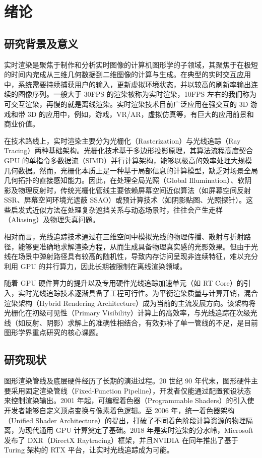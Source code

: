
\chapter{绪论}
\label{chap:introduction}

\section{研究背景及意义}
实时渲染是聚焦于制作和分析实时图像的计算机图形学的子领域，其聚焦于在极短的时间内完成从三维几何数据到二维图像的计算与生成。在典型的实时交互应用中，系统需要持续捕获用户的输入，更新虚拟环境状态，并以较高的刷新率输出连续的图像序列。一般大于 30FPS  的渲染被称为实时渲染，10FPS 左右的我们称为可交互渲染，再慢的就是离线渲染。实时渲染技术目前广泛应用在强交互的 3D 游戏和带 3D 的应用中，例如，游戏，VR/AR，虚拟仿真等，有巨大的应用前景和商业价值。

在技术路线上，实时渲染主要分为光栅化（Rasterization）与光线追踪（Ray Tracing）两种基础架构。光栅化技术基于多边形投影原理，其算法流程高度契合 GPU 的单指令多数据流（SIMD）并行计算架构，能够以极高的效率处理大规模几何数据。然而，光栅化本质上是一种基于局部信息的计算模型，缺乏对场景全局几何拓扑的直接感知能力。因此，在处理全局光照（Global Illumination）、软阴影及物理反射时，传统光栅化管线主要依赖屏幕空间近似算法（如屏幕空间反射 SSR、屏幕空间环境光遮蔽 SSAO）或预计算技术（如阴影贴图、光照探针）。这些启发式近似方法在处理复杂遮挡关系与动态场景时，往往会产生走样（Aliasing）及物理失真问题。

相对而言，光线追踪技术通过在三维空间中模拟光线的物理传播、散射与折射路径，能够更准确地求解渲染方程，从而生成具备物理真实感的光影效果。但由于光线在场景中弹射路径具有较高的随机性，导致内存访问呈现非连续特征，难以充分利用 GPU 的并行算力，因此长期被限制在离线渲染领域。

随着 GPU 硬件算力的提升以及专用硬件光线追踪加速单元（如 RT Core）的引入，实时光线追踪技术逐渐具备了工程可行性。为平衡渲染质量与计算开销，混合渲染架构（Hybrid Rendering Architecture）成为当前的主流发展方向。该架构将光栅化在初级可见性（Primary Visibility）计算上的高效率，与光线追踪在次级光线（如反射、阴影）求解上的准确性相结合，有效弥补了单一管线的不足，是目前图形学界重点研究的核心课题。

\section{研究现状}
图形渲染管线及底层硬件经历了长期的演进过程。20 世纪 90 年代末，图形硬件主要采用固定渲染管线（Fixed-Function Pipeline），开发者仅能通过配置预设状态来控制渲染输出。2001 年起，可编程着色器（Programmable Shaders）的引入使开发者能够自定义顶点变换与像素着色逻辑。至 2006 年，统一着色器架构（Unified Shader Architecture）的提出，打破了不同着色阶段计算资源的物理隔离，为现代通用 GPU 计算奠定了基础。2018 年是实时渲染的分水岭，Microsoft 发布了 DXR（DirectX Raytracing）框架，并且NVIDIA 在同年推出了基于 Turing 架构的 RTX 平台，让实时光线追踪成为可能。

